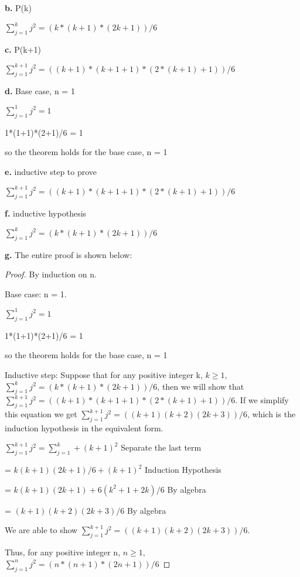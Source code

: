 \documentclass[11pt]{article}
\begin{document}
	\textbf{b.}
	P(k)
	
	$\sum_{j=1}^{k} j^2=(k*(k+1)*(2k+1))/6$
	
	\textbf{c.}
	P(k+1)
	
	$\sum_{j=1}^{k+1} j^2=((k+1)*(k+1+1)*(2*(k+1)+1))/6$
	
	\textbf{d.}
	Base case, n = 1
	
	$\sum_{j=1}^{1} j^2=1$
	
	1*(1+1)*(2+1)/6 = 1
	
	so the theorem holds for the base case, n = 1
	
	\textbf{e.}
	inductive step to prove
	
	$\sum_{j=1}^{k+1} j^2=((k+1)*(k+1+1)*(2*(k+1)+1))/6$
	
	\textbf{f.}
	inductive hypothesis
	
	$\sum_{j=1}^{k} j^2=(k*(k+1)*(2k+1))/6$
	
	\textbf{g.}
	The entire proof is shown below:
	\begin{proof}
	By induction on n.
	
	Base case: n = 1.
	
	$\sum_{j=1}^{1} j^2=1$
	
	1*(1+1)*(2+1)/6 = 1
	
	so the theorem holds for the base case, n = 1
	
	Inductive step: Suppose that for any positive integer k, $k\geq 1$, $\sum_{j=1}^{k} j^2=(k*(k+1)*(2k+1))/6$, then we will show that $\sum_{j=1}^{k+1} j^2=((k+1)*(k+1+1)*(2*(k+1)+1))/6$. If we simplify this equation we get $\sum_{j=1}^{k+1} j^2=((k+1)(k+2)(2k+3))/6$, which is the induction hypothesis in the equivalent form.
	
	$\sum_{j=1}^{k+1} j^2=\sum_{j=1}^{k}+(k+1)^2$ Separate the last term

\hspace{13.5mm}	= $k(k+1)(2k+1)/6+(k+1)^2$ Induction Hypothesis

\hspace{13.5mm}	= $k(k+1)(2k+1)+6(k^2+1+2k)/6$ By algebra

\hspace{13.5mm}	= $(k+1)(k+2)(2k+3)/6$ By algebra

    We are able to show $\sum_{j=1}^{k+1} j^2=((k+1)(k+2)(2k+3))/6$. 
    
    Thus, for any positive integer n, $n\geq 1$, $\sum_{j=1}^{n} j^2=(n*(n+1)*(2n+1))/6$ 
	
	\end{proof}
	
\end{document}
